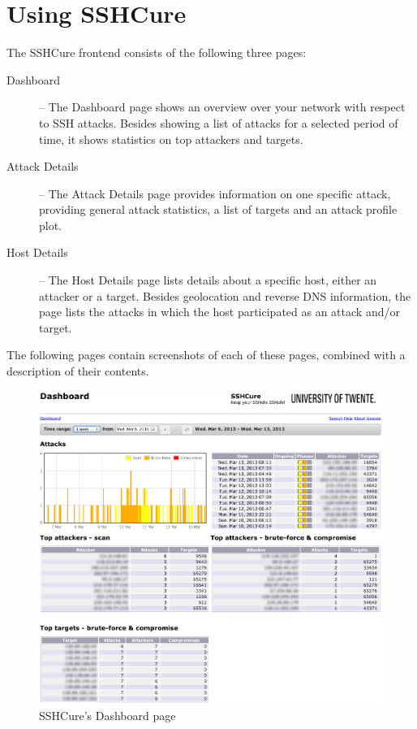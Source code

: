 \section{Using SSHCure} \label{sec:using_sshcure}

The SSHCure frontend consists of the following three pages:

\begin{description}
	\item [Dashboard] -- The Dashboard page shows an overview over your network with respect to SSH attacks. Besides showing a list of attacks for a selected period of time, it shows statistics on top attackers and targets.
	
	\item [Attack Details] -- The Attack Details page provides information on one specific attack, providing general attack statistics, a list of targets and an attack profile plot.
	
	\item [Host Details] -- The Host Details page lists details about a specific host, either an attacker or a target. Besides geolocation and reverse DNS information, the page lists the attacks in which the host participated as an attack and/or target.
\end{description}

The following pages contain screenshots of each of these pages, combined with a description of their contents.

\newpage

\begin{figure}[!ht]
	\centering
    	\includegraphics[width=\textwidth]{img/Screenshot_Dashboard_anonymized.png}
	\caption{SSHCure's Dashboard page}
	\label{fig:screenshot_Dashboard}
\end{figure}

